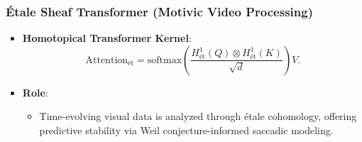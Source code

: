 \documentclass[12pt]{article}
\begin{document}
\subsubsection{Étale Sheaf Transformer (Motivic Video Processing)}
\begin{itemize}
    \item \textbf{Homotopical Transformer Kernel}:
    \[
    \mathrm{Attention}_{\text{ét}} = \mathrm{softmax}\left(\frac{H^1_{\mathrm{ét}}(Q) \otimes H^1_{\mathrm{ét}}(K)}{\sqrt{d}}\right) V.
    \]
    \item \textbf{Role}:
    \begin{itemize}
        \item Time-evolving visual data is analyzed through étale cohomology, offering predictive stability via Weil conjecture-informed saccadic modeling.
    \end{itemize}
\end{itemize}
\end{document}
